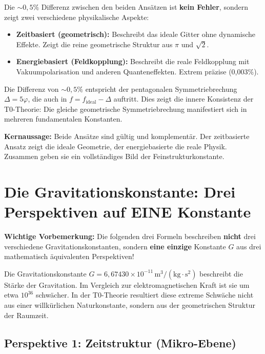 	Die \(\sim0{,}5\%\) Differenz zwischen den beiden Ansätzen ist \textbf{kein Fehler}, sondern zeigt zwei verschiedene physikalische Aspekte:
	
	\begin{itemize}
		\item \textbf{Zeitbasiert (geometrisch):} Beschreibt das ideale Gitter ohne dynamische Effekte. Zeigt die reine geometrische Struktur aus \(\pi\) und \(\sqrt{2}\).
		
		\item \textbf{Energiebasiert (Feldkopplung):} Beschreibt die reale Feldkopplung mit Vakuumpolarisation und anderen Quanteneffekten. Extrem präzise (0{,}003\%).
	\end{itemize}
	
	Die Differenz von \(\sim0{,}5\%\) entspricht der pentagonalen Symmetriebrechung \(\Delta = 5\varphi\), die auch in \(f = f_{\text{ideal}} - \Delta\) auftritt. Dies zeigt die innere Konsistenz der T0-Theorie: Die gleiche geometrische Symmetriebrechung manifestiert sich in mehreren fundamentalen Konstanten.
	
	\textbf{Kernaussage:} Beide Ansätze sind gültig und komplementär. Der zeitbasierte Ansatz zeigt die ideale Geometrie, der energiebasierte die reale Physik. Zusammen geben sie ein vollständiges Bild der Feinstrukturkonstante.
	
	\section{Die Gravitationskonstante: Drei Perspektiven auf EINE Konstante}
	
	\textbf{Wichtige Vorbemerkung:} Die folgenden drei Formeln beschreiben \textbf{nicht} drei verschiedene Gravitationskonstanten, sondern \textbf{eine einzige} Konstante \(G\) aus drei mathematisch äquivalenten Perspektiven!
	
	Die Gravitationskonstante \(G = 6{,}67430 \times 10^{-11}\,\text{m}^3/(\text{kg} \cdot \text{s}^2)\) beschreibt die Stärke der Gravitation. Im Vergleich zur elektromagnetischen Kraft ist sie um etwa \(10^{36}\) schwächer. In der T0-Theorie resultiert diese extreme Schwäche nicht aus einer willkürlichen Naturkonstante, sondern aus der geometrischen Struktur der Raumzeit.
	
	\subsection{Perspektive 1: Zeitstruktur (Mikro-Ebene)}
	
